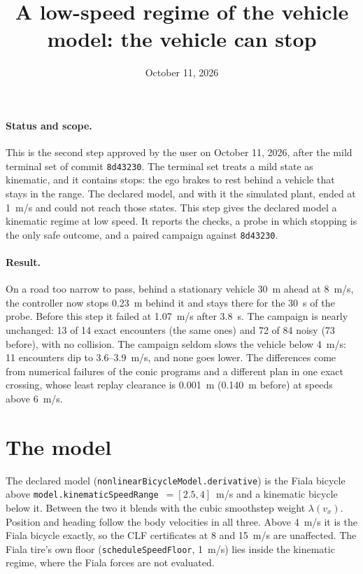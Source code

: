 \documentclass[11pt]{article}
\title{A low-speed regime of the vehicle model: the vehicle can stop}
\author{}
\date{October 11, 2026}
\begin{document}
\maketitle
\paragraph{Status and scope.}
This is the second step approved by the user on October 11, 2026, after the
mild terminal set of commit \texttt{8d43230}. The terminal set treats a mild
state as kinematic, and it contains stops: the ego brakes to rest behind a
vehicle that stays in the range. The declared model, and with it the
simulated plant, ended at 1~m/s and could not reach those states. This step
gives the declared model a kinematic regime at low speed. It reports the
checks, a probe in which stopping is the only safe outcome, and a paired
campaign against \texttt{8d43230}.

\paragraph{Result.}
On a road too narrow to pass, behind a stationary vehicle 30~m ahead at
8~m/s, the controller now stops 0.23~m behind it and stays there for the
30~s of the probe. Before this step it failed at 1.07~m/s after 3.8~s. The
campaign is nearly unchanged: 13 of 14 exact encounters (the same ones) and
72 of 84 noisy (73 before), with no collision. The campaign seldom slows
the vehicle below 4~m/s: 11 encounters dip to 3.6--3.9~m/s, and none goes
lower. The differences come from numerical failures of the conic programs and a
different plan in one exact crossing, whose least replay clearance is
0.001~m (0.140~m before) at speeds above 6~m/s.

\section{The model}
The declared model (\texttt{nonlinearBicycleModel.derivative}) is the Fiala
bicycle above \texttt{model.kinematicSpeedRange}~$=[2.5,4]$~m/s and a
kinematic bicycle below it. Between the two it blends with the cubic
smoothstep weight $\lambda(v_x)$. Position and heading follow the body
velocities in all three. Above 4~m/s it is the Fiala bicycle exactly, so the
CLF certificates at 8 and 15~m/s are unaffected. The Fiala tire's own floor
(\texttt{scheduleSpeedFloor}, 1~m/s) lies inside the kinematic regime, where
the Fiala forces are not evaluated.
\end{document}
